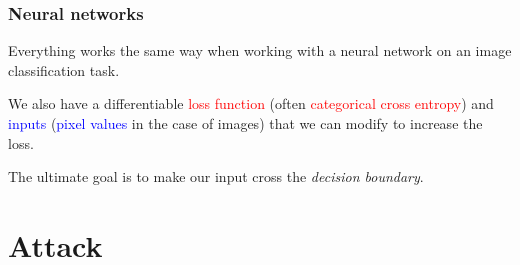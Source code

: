 \documentclass[9pt]{beamer}
\begin{document}
\begin{frame}
  \frametitle{Neural networks}

  Everything works the same way when working with a neural network on
  an image classification task.

  \bigskip

  We also have a differentiable \textcolor{red}{loss function} (often
  \textcolor{red}{categorical cross entropy}) and
  \textcolor{blue}{inputs} (\textcolor{blue}{pixel values} in the case
  of images) that we can modify to increase the loss.

  \bigskip

  The ultimate goal is to make our input cross the \emph{decision
    boundary}.

\end{frame}

\section{Attack}


\end{document}

